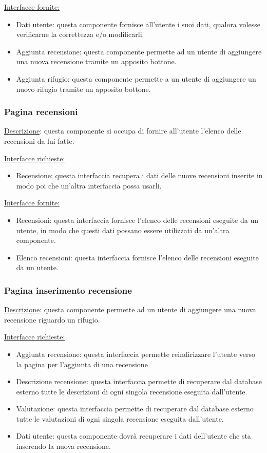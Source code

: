 \documentclass[a4paper,12pt]{article}
\begin{document}
\underline{Interfacce fornite:}
\begin{itemize}
\item Dati utente: questa componente fornisce all'utente i suoi dati, qualora volesse verificarne la correttezza e/o modificarli.
\item Aggiunta recensione: questa componente permette ad un utente di aggiungere una nuova recensione tramite un apposito bottone.
\item Aggiunta rifugio: questa componente permette a un utente di aggiungere un nuovo rifugio tramite un apposito bottone.
\end{itemize}



\subsubsection{Pagina recensioni}
\underline{Descrizione}: questa componente si occupa di fornire all'utente l'elenco delle recensioni da lui fatte.

\underline{Interfacce richieste:}
\begin{itemize}
\item Recensione: questa interfaccia recupera i dati delle nuove recensioni inserite in modo poi che un'altra interfaccia possa usarli.
\end{itemize}

\underline{Interfacce fornite:}
\begin{itemize}
\item Recensioni: questa interfaccia fornisce l'elenco delle recensioni eseguite da un utente, in modo che questi dati possano essere utilizzati da un'altra componente.
\item Elenco recensioni: questa interfaccia fornisce l'elenco delle recensioni eseguite da un utente.
\end{itemize}



\subsubsection{Pagina inserimento recensione}
\underline{Descrizione}: questa componente permette ad un utente di aggiungere una nuova recensione riguardo un rifugio.

\underline{Interfacce richieste:}
\begin{itemize}
\item Aggiunta recensione: questa interfaccia permette reindirizzare l'utente verso la pagina per l'aggiunta di una recensione 
\item Descrizione recensione: questa interfaccia permette di recuperare dal database esterno tutte le descrizioni  di ogni singola recensione eseguita dall'utente.
\item Valutazione: questa interfaccia permette di recuperare dal database esterno tutte le valutazioni di ogni singola recensione eseguita dall'utente.
\item Dati utente: questa componente dovrà recuperare i dati dell'utente che sta inserendo la nuova recensione.
\end{itemize}
\end{document}
